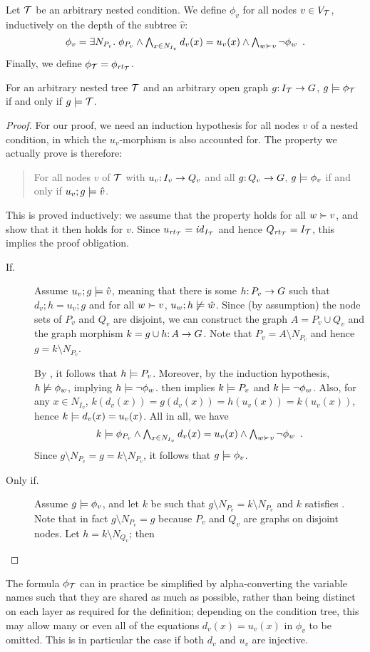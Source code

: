Let ${\mathcal{T}}$ be an arbitrary nested condition. We define $\phi_v$ for all nodes $v\in V_{\mathcal{T}}$, inductively on the depth of the subtree $\hat v$:
%
\[ \phi_v = \textstyle \exists N_{P_v}\st \phi_{P_v}\wedge \bigwedge_{x\in N_{I_v}} d_v(x)=u_v(x) \wedge \bigwedge_{w\childof v} \neg\phi_w \enspace. \]
%
Finally, we define $\phi_{\mathcal{T}}=\phi_{\mathit{rt}_{{\mathcal{T}}}}$.
%
\begin{theorem}
For an arbitrary nested tree ${\mathcal{T}}$ and an arbitrary open graph $g{:}\, I_{\mathcal{T}}\rightarrow G$, $g\models\phi_{\mathcal{T}}$ if and only if $g\models{\mathcal{T}}$.
\end{theorem}
%
\begin{proof}
For our proof, we need an induction hypothesis for all nodes $v$ of a nested condition, in which the $u_v$-morphism is also accounted for. The property we actually prove is therefore:
\begin{quote}
For all nodes $v$ of ${\mathcal{T}}$ with $u_v{:}\, I_v\rightarrow Q_v$ and all $g{:}\, Q_v\rightarrow G$, $g\models \phi_v$ if and only if $u_v;g\models \hat v$.
\end{quote}
This is proved inductively: we assume that the property holds for all $w\childof v$, and show that it then holds for $v$. Since $u_{\mathit{rt}_{{\mathcal{T}}}}={\mathit{id}}_{I_{\mathcal{T}}}$ and hence $Q_{\mathit{rt}_{{\mathcal{T}}}}=I_{\mathcal{T}}$, this implies the proof obligation.
%
\begin{description}
\item[If.] Assume $u_v;g\models \hat v$, meaning that there is some $h{:}\, P_v\rightarrow G$ such that $d_v;h=u_v;g$ and for all $w\childof v$, $u_w;h\not\models \hat w$. Since (by assumption) the node sets of $P_v$ and $Q_v$ are disjoint, we can construct the graph $A=P_v\cup Q_v$ and the graph morphism $k=g\cup h{:}\, A\rightarrow G$. Note that $P_v=A\setminus N_{P_v}$ and hence $g=k\setminus N_{P_v}$.


By , it follows that $h\models P_v$. Moreover, by the induction hypothesis, $h\not\models \phi_w$, implying $h\models\neg \phi_w$.  then implies $k\models P_v$ and $k\models \neg\phi_w$. Also, for any $x\in N_{I_v}$, $k(d_v(x))=g(d_v(x))=h(u_v(x))=k(u_v(x))$, hence $k\models d_v(x)=u_v(x)$. All in all, we have
%
\begin{equation}\label{eq:k}
k\sat \textstyle \phi_{P_v}\wedge \bigwedge_{x\in N_{I_v}} d_v(x)=u_v(x) \wedge \bigwedge_{w\childof v} \neg\phi_w \enspace.
\end{equation}
%
Since $g\setminus N_{P_v}=g=k\setminus N_{P_v}$, it follows that $g\models \phi_v$.

\item[Only if.] Assume $g\models \phi_v$, and let $k$ be such that $g\setminus N_{P_v}=k\setminus N_{P_v}$ and $k$ satisfies . Note that in fact $g\setminus N_{P_v}=g$ because $P_v$ and $Q_v$ are  graphs on disjoint nodes. Let $h=k\setminus N_{Q_v}$; then 
\end{description}
\end{proof}
%
The formula $\phi_{\mathcal{T}}$ can in practice be simplified by alpha-converting the variable names such that they are shared as much as possible, rather than being distinct on each layer as required for the definition; depending on the condition tree, this may allow many or even all of the equations $d_v(x)=u_v(x)$ in $\phi_v$ to be omitted. This is in particular the case if both $d_v$ and $u_v$ are injective.

